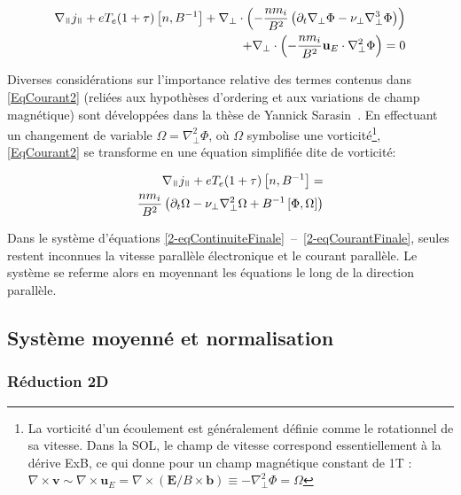 \begin{refsection}
\begin{equation}\begin{split}
\label{EqCourant2}
\nabla_\para j_\para +
eT_e(1+\tau)\left[n,B\puissance{-1}\right] +
\nabla_\perp\cdot\left(-\frac{nm_{i}}{B^2}\left(\partial_{t}\nabla_\perp \Phi - \nu_\perp \nabla_\perp^3 \Phi \right)\right) \\+
\nabla_\perp\cdot\left(-\frac{nm_{i}}{B^2}\mathbf{u}_E\cdot\nabla_\perp^2
\Phi\right)=0
\end{split}
\end{equation}

Diverses considérations sur l'importance relative des termes contenus dans
\eqref{EqCourant2} (reliées aux hypothèses d'ordering
et aux variations de champ magnétique) sont développées dans la thèse de Yannick
Sarasin~\cite{SarazinPhD}. En effectuant un changement de variable
$\Omega=\nabla_\perp^2\Phi$, où $\Omega$ symbolise une vorticité\footnote{La
vorticité d'un écoulement est généralement définie comme le rotationnel de sa vitesse. Dans la SOL, le champ de vitesse correspond essentiellement à la dérive ExB, ce qui donne pour un champ magnétique constant de 1T : 
$\nabla\times\mathbf{v}\sim\nabla\times\mathbf{u}_E=\nabla\times(\mathbf{E}/B\times\mathbf{b})\equiv-\nabla_\perp^2
\Phi=\Omega$ }, \eqref{EqCourant2} se transforme en une équation simplifiée dite
de vorticité:

\begin{equation}\begin{split}
\label{2-eqCourantFinale}
\nabla_\para{j}_\para +
eT_e(1+\tau)\left[n,B\puissance{-1}\right] =\\
\frac{nm_i}{B^2}\left(\partial_{t}\Omega - \nu_\perp
\nabla_\perp^2\Omega+
B\puissance{-1}\left[\Phi,\Omega\right]\right)
\end{split}
\end{equation} 

 Dans le système d'équations
 \eqref{2-eqContinuiteFinale}~--~\eqref{2-eqCourantFinale}, seules restent
 inconnues la vitesse parallèle électronique  et le courant parallèle. Le
 système se referme alors en moyennant les équations le long de la
 direction parallèle. 

\subsection{Système moyenné et normalisation}
\label{2-flute}
\subsubsection{Réduction 2D}


\end{refsection}
